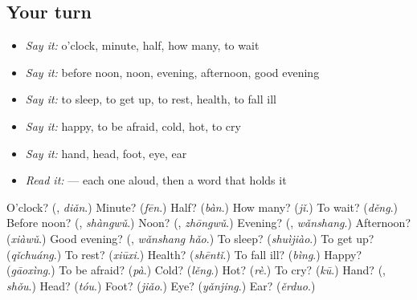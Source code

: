 \subsection*{Your turn}
\begin{itemize}
\raggedright
  \item \emph{Say it:} o'clock, minute, half, how many, to wait
  \item \emph{Say it:} before noon, noon, evening, afternoon, good evening
  \item \emph{Say it:} to sleep, to get up, to rest, health, to fall ill
  \item \emph{Say it:} happy, to be afraid, cold, hot, to cry
  \item \emph{Say it:} hand, head, foot, eye, ear
  \item \emph{Read it:}     — each one aloud, then a word that holds it
\end{itemize}

\begin{tcolorbox}[breakable,colback=teal!4,colframe=teal!35!black,title={Before you move on}]
O'clock? (\textbf{}, \emph{diǎn}.) Minute? (\emph{fēn}.) Half? (\emph{bàn}.) How many? (\emph{jǐ}.) To wait? (\emph{děng}.) Before noon? (\textbf{}, \emph{shàngwǔ}.) Noon? (\textbf{}, \emph{zhōngwǔ}.) Evening? (\textbf{}, \emph{wǎnshang}.) Afternoon? (\emph{xiàwǔ}.) Good evening? (\textbf{}, \emph{wǎnshang hǎo}.) To sleep? (\emph{shuìjiào}.) To get up? (\emph{qǐchuáng}.) To rest? (\emph{xiūxi}.) Health? (\emph{shēntǐ}.) To fall ill? (\emph{bìng}.) Happy? (\emph{gāoxìng}.) To be afraid? (\emph{pà}.) Cold? (\emph{lěng}.) Hot? (\emph{rè}.) To cry? (\emph{kū}.) Hand? (\textbf{}, \emph{shǒu}.) Head? (\emph{tóu}.) Foot? (\emph{jiǎo}.) Eye? (\emph{yǎnjing}.) Ear? (\emph{ěrduo}.)
\end{tcolorbox}
